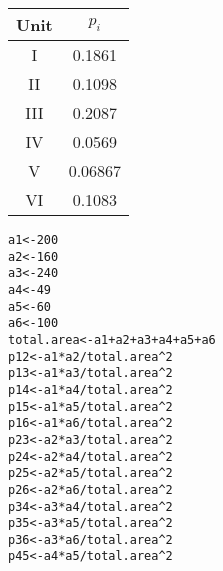 \documentclass[12pt]{article}\usepackage[]{graphicx}\usepackage[]{color}
\makeatletter
\newcommand{\hlnum}[1]{\textcolor[rgb]{0.686,0.059,0.569}{#1}}%
\newcommand{\hlopt}[1]{\textcolor[rgb]{0,0,0}{#1}}%
\newcommand{\hlstd}[1]{\textcolor[rgb]{0.345,0.345,0.345}{#1}}%
\newcommand{\hlkwb}[1]{\textcolor[rgb]{0.69,0.353,0.396}{#1}}%
\newenvironment{kframe}{%
 \def\at@end@of@kframe{}%
 \ifinner\ifhmode%
  \def\at@end@of@kframe{\end{minipage}}%
  \begin{minipage}{\columnwidth}%
 \fi\fi%
 \def\FrameCommand##1{\hskip\@totalleftmargin \hskip-\fboxsep
 \colorbox{shadecolor}{##1}\hskip-\fboxsep
     \hskip-\linewidth \hskip-\@totalleftmargin \hskip\columnwidth}%
 \MakeFramed {\advance\hsize-\width
   \@totalleftmargin\z@ \linewidth\hsize
   \@setminipage}}%
 {\par\unskip\endMakeFramed%
 \at@end@of@kframe}
\newenvironment{knitrout}{}{} %
\makeatother
\begin{document}
\begin{doublespacing}
\begin{enumerate}
\begin{enumerate}
\begin{multicols}{2}
\begin{table}[H]
\begin{tabular}{cc}
Unit & $p_i$ \\
\hline
I & 0.1861 \\
II & 0.1098 \\
III & 0.2087 \\
IV & 0.0569 \\
V & 0.06867 \\
VI & 0.1083 \\
\hline
\end{tabular}
\end{table}
\end{multicols}

\begin{singlespace}
\begin{knitrout}\footnotesize
{}\color{fgcolor}\begin{kframe}
\begin{alltt}
\hlstd{a1} \hlkwb{<-} \hlnum{200}
\hlstd{a2} \hlkwb{<-} \hlnum{160}
\hlstd{a3} \hlkwb{<-} \hlnum{240}
\hlstd{a4} \hlkwb{<-} \hlnum{49}
\hlstd{a5} \hlkwb{<-} \hlnum{60}
\hlstd{a6} \hlkwb{<-} \hlnum{100}
\hlstd{total.area} \hlkwb{<-} \hlstd{a1} \hlopt{+} \hlstd{a2} \hlopt{+} \hlstd{a3} \hlopt{+} \hlstd{a4} \hlopt{+} \hlstd{a5} \hlopt{+} \hlstd{a6}
\hlstd{p12} \hlkwb{<-} \hlstd{a1}\hlopt{*}\hlstd{a2}\hlopt{/}\hlstd{total.area}\hlopt{^}\hlnum{2}
\hlstd{p13} \hlkwb{<-} \hlstd{a1}\hlopt{*}\hlstd{a3}\hlopt{/}\hlstd{total.area}\hlopt{^}\hlnum{2}
\hlstd{p14} \hlkwb{<-} \hlstd{a1}\hlopt{*}\hlstd{a4}\hlopt{/}\hlstd{total.area}\hlopt{^}\hlnum{2}
\hlstd{p15} \hlkwb{<-} \hlstd{a1}\hlopt{*}\hlstd{a5}\hlopt{/}\hlstd{total.area}\hlopt{^}\hlnum{2}
\hlstd{p16} \hlkwb{<-} \hlstd{a1}\hlopt{*}\hlstd{a6}\hlopt{/}\hlstd{total.area}\hlopt{^}\hlnum{2}
\hlstd{p23} \hlkwb{<-} \hlstd{a2}\hlopt{*}\hlstd{a3}\hlopt{/}\hlstd{total.area}\hlopt{^}\hlnum{2}
\hlstd{p24} \hlkwb{<-} \hlstd{a2}\hlopt{*}\hlstd{a4}\hlopt{/}\hlstd{total.area}\hlopt{^}\hlnum{2}
\hlstd{p25} \hlkwb{<-} \hlstd{a2}\hlopt{*}\hlstd{a5}\hlopt{/}\hlstd{total.area}\hlopt{^}\hlnum{2}
\hlstd{p26} \hlkwb{<-} \hlstd{a2}\hlopt{*}\hlstd{a6}\hlopt{/}\hlstd{total.area}\hlopt{^}\hlnum{2}
\hlstd{p34} \hlkwb{<-} \hlstd{a3}\hlopt{*}\hlstd{a4}\hlopt{/}\hlstd{total.area}\hlopt{^}\hlnum{2}
\hlstd{p35} \hlkwb{<-} \hlstd{a3}\hlopt{*}\hlstd{a5}\hlopt{/}\hlstd{total.area}\hlopt{^}\hlnum{2}
\hlstd{p36} \hlkwb{<-} \hlstd{a3}\hlopt{*}\hlstd{a6}\hlopt{/}\hlstd{total.area}\hlopt{^}\hlnum{2}
\hlstd{p45} \hlkwb{<-} \hlstd{a4}\hlopt{*}\hlstd{a5}\hlopt{/}\hlstd{total.area}\hlopt{^}\hlnum{2}

\end{alltt}
\end{kframe}
\end{knitrout}
\end{singlespace}
\end{enumerate}
\end{enumerate}
\end{doublespacing}
\end{document}
